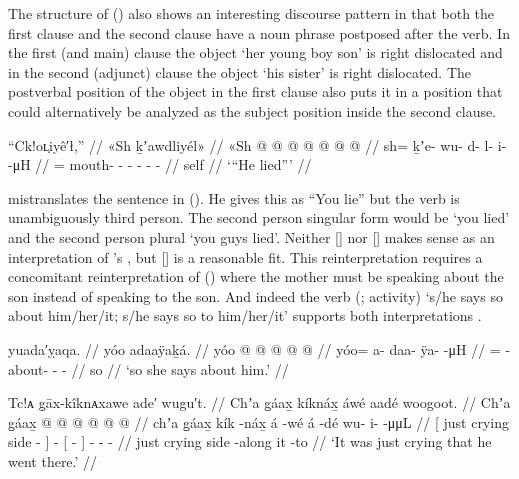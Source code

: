 The structure of (\lastx) also shows an interesting discourse pattern in that both the first clause and the second clause have a noun phrase postposed after the verb.
In the first (and main) clause the object  ‘her young boy son’ is right dislocated and in the second (adjunct) clause the object  ‘his sister’ is right dislocated.
The postverbal position of the object in the first clause also puts it in a position that could alternatively be analyzed as the subject position inside the second clause.

\ex\label{ex:92-179-he-lied}%
%
\begingl
	\glpreamble	“Ck!oʟ̣iyê′ł,” //
	\glpreamble	«\!Sh ḵʼawdliyél\!» //
	\gla	«\!Sh @  @ {} @ {} @ {} @ {} @ {} @ {} //
	\glb	\pqp{}sh= ḵʼe- wu- d- l- i-  -μH //
	\glc	\pqp{}= mouth- - - - -
			 - //
	\gld	\pqp{}self  {} {} {} {} {} {} //
	\glft	‘“He lied”’
		//
\endgl
\xe

\citeauthor{swanton:1909} mistranslates the sentence in (\lastx).
He gives this as “You lie” but the verb  is unambiguously third person.
The second person singular form would be  ‘you lied’ and the second person plural  ‘you guys lied’. 
Neither  [] nor  [] makes sense as an interpretation of \citeauthor{swanton:1909}’s , but  [] is a reasonable fit.
This reinterpretation requires a concomitant reinterpretation of (\nextx) where the mother must be speaking about the son instead of speaking to the son.
And indeed the verb  (;  activity) ‘s/he says so about him/her/it; s/he says so to him/her/it’ supports both interpretations \parencite[858]{leer:1976}.

\ex\label{ex:92-180-so-she-says}%
%
\begingl
	\glpreamble	yuada′ỵaqa. //
	\glpreamble	yóo adaaÿaḵá. //
	\gla	yóo @  @ {} @ {} @ {} @ {} //
	\glb	yóo= a- daa- ÿa-  -μH //
	\glc	{}= - about- -  - //
	\gld	so  {} {} {} {} //
	\glft	‘so she says about him.’
		//
\endgl
\xe

\ex\label{ex:92-181-alongside-crying-he-went}%
%
\begingl
	\glpreamble	Tc!ᴀ g̣āx-kîknᴀxawe ade′ wugu′t. //
	\glpreamble	Chʼa g̱áax̱ kíknáx̱ áwé aadé woogoot. //
	\gla	{} Chʼa g̱áax̱  @ {} {}  @ {}
		{}  @ {} {}  @ {} @ {} @ {} //
	\glb	{} chʼa g̱áax̱ kík -náx̱ {} á -wé
		{} á -dé {} wu- i-  -μμL //
	\glc	{}[ just crying side - {}]  -
		{}[  - {}]
		- -  - //
	\gld	{} just crying side -along {}  {}
		{} it -to {}  {} {} {} //
	\glft	‘It was just crying that he went there.’
		//
\endgl
\xe

